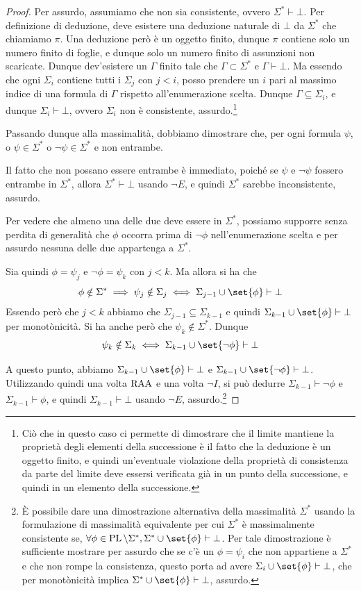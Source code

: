 \begin{proof}
  Per assurdo, assumiamo che non sia consistente, ovvero \(\Sigma^*\vdash\bot\). Per definizione di deduzione, deve esistere una deduzione naturale di \(\bot\) da \(\Sigma^*\) che chiamiamo \(\pi\). Una deduzione però è un oggetto finito, dunque \(\pi\) contiene solo un numero finito di foglie, e dunque solo un numero finito di assunzioni non scaricate. Dunque dev'esistere un \(\Gamma\) finito tale che \(\Gamma\subset\Sigma^*\) e \(\Gamma\vdash\bot\). Ma essendo che ogni \(\Sigma_i\) contiene tutti i \(\Sigma_j\) con \(j<i\), posso prendere un \(i\) pari al massimo indice di una formula di \(\Gamma\) rispetto all'enumerazione scelta. Dunque \(\Gamma\subseteq\Sigma_i\), e dunque \(\Sigma_i\vdash\bot\), ovvero \(\Sigma_i\) non è consistente, assurdo.\footnote{Ciò che in questo caso ci permette di dimostrare che il limite mantiene la proprietà degli elementi della successione è il fatto che la deduzione è un oggetto finito, e quindi un'eventuale violazione della proprietà di consistenza da parte del limite deve essersi verificata già in un punto della successione, e quindi in un elemento della successione.}

  Passando dunque alla massimalità, dobbiamo dimostrare che, per ogni formula \(\psi\), o \(\psi\in\Sigma^*\) o \(\neg\psi\in\Sigma^*\) e non entrambe.

  Il fatto che non possano essere entrambe è immediato, poiché se \(\psi\) e \(\neg\psi\) fossero entrambe in \(\Sigma^*\), allora \(\Sigma^*\vdash\bot\) usando \(\neg E\), e quindi \(\Sigma^*\) sarebbe inconsistente, assurdo.

  Per vedere che almeno una delle due deve essere in \(\Sigma^*\), possiamo supporre senza perdita di generalità che \(\phi\) occorra prima di \(\neg\phi\) nell'enumerazione scelta e 
  per assurdo nessuna delle due appartenga a \(\Sigma^*\).

  Sia quindi \(\phi=\psi_j\) e \(\neg\phi=\psi_k\) con \(j<k\).
  Ma allora si ha che
  \[\phi\notin\Sigma^* \implies \psi_j \notin \Sigma_j \iff \Sigma_{j-1}\cup\set{\phi} \vdash \bot\]
  Essendo però che \(j<k\) abbiamo che \(\Sigma_{j-1}\subseteq\Sigma_{k-1}\) e quindi \(\Sigma_{k-1}\cup\set{\phi} \vdash \bot\) per monotònicità.
  Si ha anche però che \(\psi_k\notin\Sigma^*\). Dunque
  \[\psi_k \notin \Sigma_k \iff \Sigma_{k-1}\cup\set{\neg\phi}\vdash \bot\]

  A questo punto, abbiamo \(\Sigma_{k-1}\cup\set{\phi}\vdash\bot\) e \(\Sigma_{k-1}\cup\set{\neg\phi}\vdash\bot\). Utilizzando quindi una volta \(\operatorname{RAA}\) e una volta \(\neg I\), si può dedurre \(\Sigma_{k-1}\vdash\neg\phi\) e \(\Sigma_{k-1}\vdash\phi\), e quindi \(\Sigma_{k-1}\vdash\bot\) usando \(\neg E\), assurdo.\footnote{È possibile dare una dimostrazione alternativa della massimalità \(\Sigma^*\) usando la formulazione di massimalità equivalente per cui \(\Sigma^*\) è massimalmente consistente se, \(\forall \phi \in \PL\setminus\Sigma^*, \Sigma^*\cup\set{\phi}\vdash\bot\).
  Per tale dimostrazione è sufficiente mostrare per assurdo che se c'è un \(\phi=\psi_i\) che non appartiene a \(\Sigma^*\) e che non rompe la consistenza, questo porta ad avere \(\Sigma_i\cup\set{\phi}\vdash\bot\), che per monotònicità implica \(\Sigma^*\cup\set{\phi}\vdash\bot\), assurdo.}
\end{proof}

